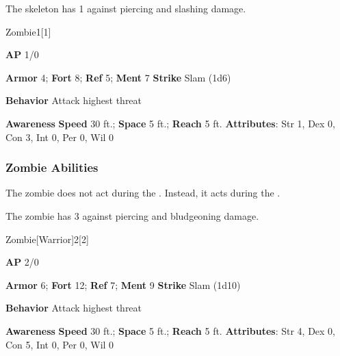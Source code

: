 The skeleton has  1 against piercing and slashing damage.

\begin{monsection}{Zombie}{1}[1]
\vspace{-1em}\vspace{-1em}
\begin{spellcontent}
\begin{spelltargetinginfo}
{\textbf{AP} 1/0}

\pari \textbf{Armor} 4;
\textbf{Fort} 8;
\textbf{Ref} 5;
\textbf{Ment} 7
\pari \textbf{Strike} Slam  (1d6)



\pari \textbf{Behavior} Attack highest threat
\end{spelltargetinginfo}
\end{spellcontent}

\begin{monsterfooter}
\pari \textbf{Awareness} 
\pari \textbf{Speed} 30 ft.;
\textbf{Space} 5 ft.;
\textbf{Reach} 5 ft.
\pari \textbf{Attributes}:
Str 1,
Dex 0,
Con 3,
Int 0,
Per 0,
Wil 0
\end{monsterfooter}
\end{monsection}


\subsubsection{Zombie Abilities}

The zombie does not act during the .
Instead, it acts during the .

\vspace{0.5em}
The zombie has  3 against piercing and bludgeoning damage.

\begin{monsection}{Zombie}[Warrior]{2}[2]
\vspace{-1em}\vspace{-1em}
\begin{spellcontent}
\begin{spelltargetinginfo}
{\textbf{AP} 2/0}

\pari \textbf{Armor} 6;
\textbf{Fort} 12;
\textbf{Ref} 7;
\textbf{Ment} 9
\pari \textbf{Strike} Slam  (1d10)



\pari \textbf{Behavior} Attack highest threat
\end{spelltargetinginfo}
\end{spellcontent}

\begin{monsterfooter}
\pari \textbf{Awareness} 
\pari \textbf{Speed} 30 ft.;
\textbf{Space} 5 ft.;
\textbf{Reach} 5 ft.
\pari \textbf{Attributes}:
Str 4,
Dex 0,
Con 5,
Int 0,
Per 0,
Wil 0
\end{monsterfooter}
\end{monsection}


